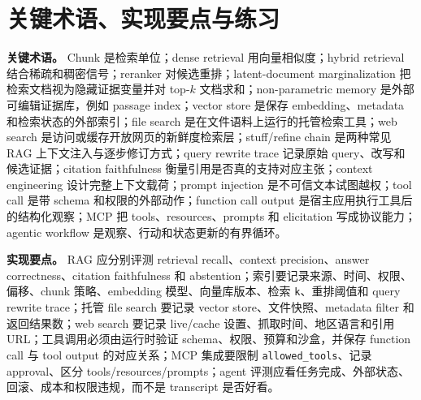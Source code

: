 \documentclass[UTF8,zihao=-4,openany]{ctexbook}
\begin{document}
\section{关键术语、实现要点与练习}
\textbf{关键术语。} Chunk 是检索单位；dense retrieval 用向量相似度；hybrid retrieval 结合稀疏和稠密信号；reranker 对候选重排；latent-document marginalization 把检索文档视为隐藏证据变量并对 top-$k$ 文档求和；non-parametric memory 是外部可编辑证据库，例如 passage index；vector store 是保存 embedding、metadata 和检索状态的外部索引；file search 是在文件语料上运行的托管检索工具；web search 是访问或缓存开放网页的新鲜度检索层；stuff/refine chain 是两种常见 RAG 上下文注入与逐步修订方式；query rewrite trace 记录原始 query、改写和候选证据；citation faithfulness 衡量引用是否真的支持对应主张；context engineering 设计完整上下文载荷；prompt injection 是不可信文本试图越权；tool call 是带 schema 和权限的外部动作；function call output 是宿主应用执行工具后的结构化观察；MCP 把 tools、resources、prompts 和 elicitation 写成协议能力；agentic workflow 是观察、行动和状态更新的有界循环。

\textbf{实现要点。} RAG 应分别评测 retrieval recall、context precision、answer correctness、citation faithfulness 和 abstention；索引要记录来源、时间、权限、偏移、chunk 策略、embedding 模型、向量库版本、检索 \texttt{k}、重排阈值和 query rewrite trace；托管 file search 要记录 vector store、文件快照、metadata filter 和返回结果数；web search 要记录 live/cache 设置、抓取时间、地区语言和引用 URL；工具调用必须由运行时验证 schema、权限、预算和沙盒，并保存 function call 与 tool output 的对应关系；MCP 集成要限制 \texttt{allowed\_tools}、记录 approval、区分 tools/resources/prompts；agent 评测应看任务完成、外部状态、回滚、成本和权限违规，而不是 transcript 是否好看。
\end{document}
